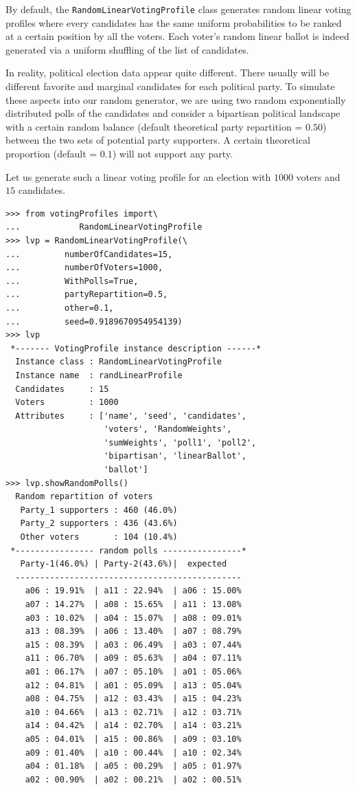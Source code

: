 By default, the \texttt{RandomLinearVotingProfile} class generates random linear voting profiles where every candidates has the same uniform probabilities to be ranked at a certain position by all the voters. Each voter's random linear ballot is indeed generated  via a uniform shuffling of the list of candidates.

In reality, political election data appear quite different. There usually will be different favorite and marginal candidates for each political party. To simulate these aspects into our random generator, we are using two random exponentially distributed polls of the candidates and consider a bipartisan political landscape with a certain random balance (default theoretical party repartition = $0.50$) between the two sets of potential party supporters. A certain theoretical proportion (default = $0.1$) will not support any party.

Let us generate such a linear voting profile for an election with $1000$ voters and $15$ candidates.

\begin{lstlisting}[caption={Generating a linear voting profile with random polls},label=list:7.7]
>>> from votingProfiles import\
...            RandomLinearVotingProfile
>>> lvp = RandomLinearVotingProfile(\
...         numberOfCandidates=15,
...         numberOfVoters=1000,
...         WithPolls=True,
...         partyRepartition=0.5,
...         other=0.1,
...         seed=0.9189670954954139)
>>> lvp
 *------- VotingProfile instance description ------*
  Instance class : RandomLinearVotingProfile
  Instance name  : randLinearProfile
  Candidates     : 15
  Voters         : 1000
  Attributes     : ['name', 'seed', 'candidates',
                    'voters', 'RandomWeights',
                    'sumWeights', 'poll1', 'poll2',
                    'bipartisan', 'linearBallot',
                    'ballot']
>>> lvp.showRandomPolls()
  Random repartition of voters
   Party_1 supporters : 460 (46.0%)
   Party_2 supporters : 436 (43.6%)
   Other voters       : 104 (10.4%)
 *---------------- random polls ----------------*
   Party-1(46.0%) | Party-2(43.6%)|  expected  
  ----------------------------------------------
    a06 : 19.91%  | a11 : 22.94%  | a06 : 15.00%
    a07 : 14.27%  | a08 : 15.65%  | a11 : 13.08%
    a03 : 10.02%  | a04 : 15.07%  | a08 : 09.01%
    a13 : 08.39%  | a06 : 13.40%  | a07 : 08.79%
    a15 : 08.39%  | a03 : 06.49%  | a03 : 07.44%
    a11 : 06.70%  | a09 : 05.63%  | a04 : 07.11%
    a01 : 06.17%  | a07 : 05.10%  | a01 : 05.06%
    a12 : 04.81%  | a01 : 05.09%  | a13 : 05.04%
    a08 : 04.75%  | a12 : 03.43%  | a15 : 04.23%
    a10 : 04.66%  | a13 : 02.71%  | a12 : 03.71%
    a14 : 04.42%  | a14 : 02.70%  | a14 : 03.21%
    a05 : 04.01%  | a15 : 00.86%  | a09 : 03.10%
    a09 : 01.40%  | a10 : 00.44%  | a10 : 02.34%
    a04 : 01.18%  | a05 : 00.29%  | a05 : 01.97%
    a02 : 00.90%  | a02 : 00.21%  | a02 : 00.51%
\end{lstlisting}

